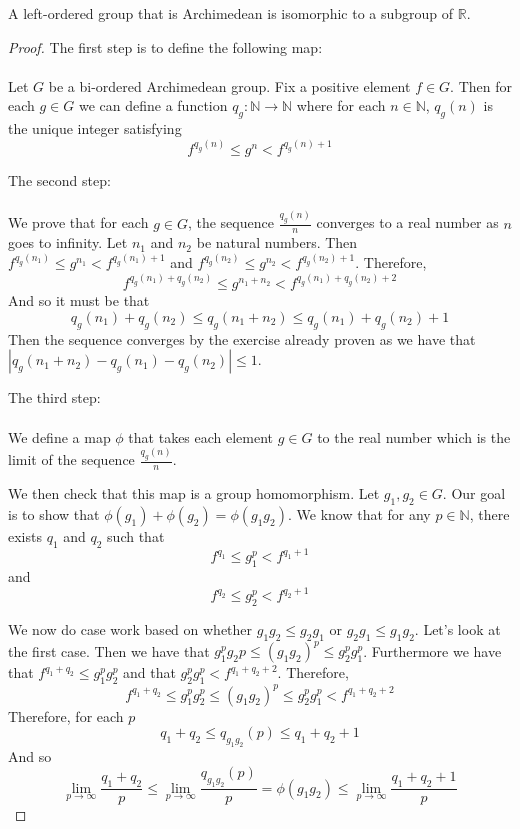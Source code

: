 \begin{theorem}\leanok
A left-ordered group that is Archimedean is isomorphic to a
subgroup of $\mathbb{R}$.
\end{theorem}
\begin{proof}
The first step is to define the following map:\\ \\
Let $G$ be a bi-ordered Archimedean group.
Fix a positive element $f \in G$. Then for each $g \in G$
we can define a function $q_g\colon \mathbb{N} \to \mathbb{N}$ where
for each $n \in \mathbb{N}$, $q_g(n)$ is the unique integer satisfying
\[
f^{q_g(n)} \le g^n < f^{q_g(n) + 1}
\]

The second step:\\ \\ 
We prove that for each $g \in G$,
the sequence $\frac{q_g(n)}{n}$ converges to a real number as $n$
goes to infinity.
Let $n_1$ and $n_2$ be natural numbers. Then
$f^{q_g(n_1)} \le g^{n_1} < f^{q_g(n_1) + 1}$ and
$f^{q_g(n_2)} \le g^{n_2} < f^{q_g(n_2) + 1}$.
Therefore,
\[
f^{q_g(n_1)+q_g(n_2)} \le g^{n_1+n_2} < f^{q_g(n_1) + q_g(n_2) + 2}
\]
And so it must be that 
\[
q_g(n_1) + q_g(n_2) \le q_g(n_1 + n_2) \le q_g(n_1) + q_g(n_2) + 1
\]
Then the sequence converges by the exercise already proven as we have that
$|q_g(n_1+n_2) - q_g(n_1) - q_g(n_2)| \le 1$.

The third step:\\ \\
We define a map $\phi$ that takes each element $g \in G$ to the real number which is the limit
of the sequence $\frac{q_g(n)}{n}$.

We then check that this map is a group homomorphism.
Let $g_1,g_2 \in G$. Our goal is to show that $\phi(g_1) + \phi(g_2) = \phi(g_1g_2)$.
We know that for any $p \in \mathbb{N}$, there exists $q_1$ and $q_2$ such that
\[
f^{q_1} \le g_1^p < f^{q_1 + 1}
\]
and
\[
f^{q_2} \le g_2^p < f^{q_2 + 1}
\]

We now do case work based on whether $g_1g_2 \le g_2g_1$ or
$g_2g_1 \le g_1g_2$. Let's look at the first case.
Then we have that $g_1^pg_2p \le (g_1g_2)^p \le g_2^pg_1^p$.
Furthermore we have that $f^{q_1+q_2} \le g_1^pg_2^p$ and that
$g_2^pg_1^p < f^{q_1+q_2+2}$. Therefore,
\[
f^{q_1+q_2} \le g_1^pg_2^p \le (g_1g_2)^p \le g_2^pg_1^p < f^{q_1+q_2+2}
\]
Therefore, for each $p$
\[
q_1+q_2 \le q_{g_1g_2}(p) \le q_1+q_2 + 1
\]
And so
\[
\lim_{p \to\infty} \frac{q_1+q_2}{p} \le \lim_{p\to\infty} \frac{q_{g_1g_2}(p)}{p}=\phi(g_1g_2) \le \lim_{p\to\infty} \frac{q_1+q_2 + 1}{p}
\]


\end{proof}
